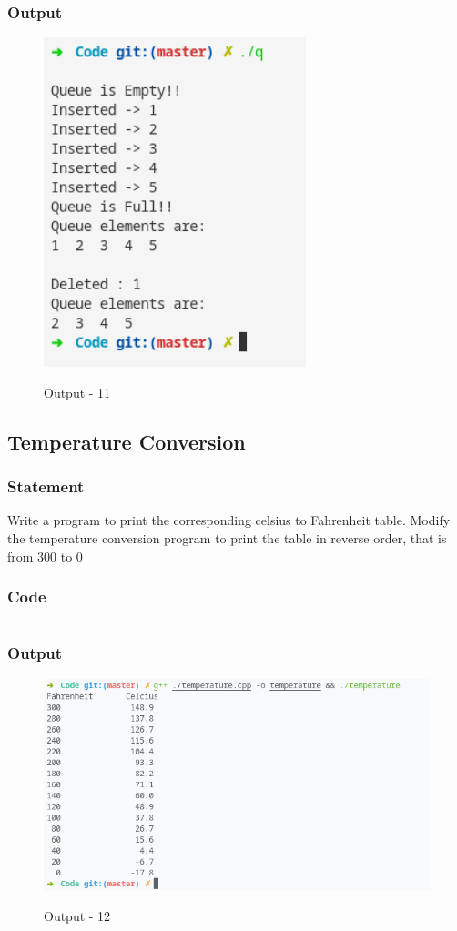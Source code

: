 \subsubsection{Output}
\begin{figure}[!htb]
  \centering
  \includegraphics[width=3in]{Images/q.png}
  \label{Output-11}
  \caption{Output - 11}
\end{figure}


\pagebreak
\subsection{Temperature Conversion}
\subsubsection{Statement}
Write a program to print the corresponding celsius to Fahrenheit table. Modify the
temperature conversion program to print the table in reverse order, that is from 300 to 0
\subsubsection{Code}
\inputminted[]{c}{'../Code/temperature.cpp'}
\subsubsection{Output}
\begin{figure}[!htb]
  \centering
  \includegraphics[width=6in]{Images/temperature.png}
  \label{Output-12}
  \caption{Output - 12}
\end{figure}


